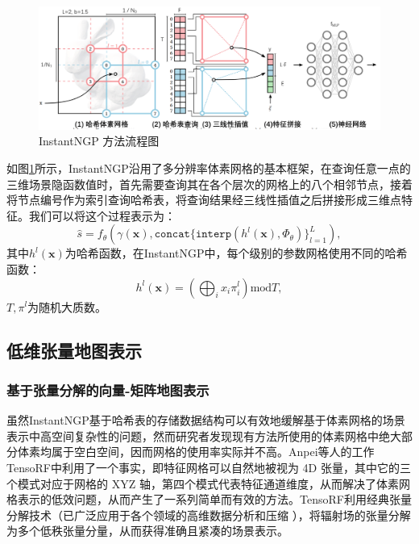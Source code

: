 \begin{figure}[ht]
    \centering
    \includegraphics[width=\textwidth]{undergraduate-thesis/images/related-work/instantngp.pdf}
    \caption{InstantNGP\cite{muller_instant_2022} 方法流程图}
    \label{fig:related-work instantngp}
\end{figure}

如图\ref{fig:related-work instantngp}所示，InstantNGP沿用了多分辨率体素网格的基本框架，在查询任意一点的三维场景隐函数值时，首先需要查询其在各个层次的网格上的八个相邻节点，接着将节点编号作为索引查询哈希表，将查询结果经三线性插值之后拼接形成三维点特征。我们可以将这个过程表示为：
\begin{equation}
    \hat{s} = f_\theta(\gamma(\mathbf{x}), \mathtt{concat}\{\mathtt{interp}(h^l(\mathbf{x}), \Phi_\theta)\}_{l=1}^L),
\end{equation}
其中$h^l(\mathbf{x})$为哈希函数，在InstantNGP中，每个级别的参数网格使用不同的哈希函数：
\begin{equation}
    h^l(\mathbf{x}) = \left(\bigoplus_{i}x_i\pi_i^l\right) \text{mod} T,
\end{equation}
$T, \pi^l$为随机大质数。

\subsection{低维张量地图表示}
\label{sec: related-work multi-plane-based implicit representations}
\subsubsection{基于张量分解的向量-矩阵地图表示}
虽然InstantNGP基于哈希表的存储数据结构可以有效地缓解基于体素网格的场景表示中高空间复杂性的问题，然而研究者发现现有方法所使用的体素网格中绝大部分体素均属于空白空间，因而网格的使用率实际并不高。Anpei等人\cite{chen_tensorf_2022}的工作TensoRF中利用了一个事实，即特征网格可以自然地被视为 4D 张量，其中它的三个模式对应于网格的 XYZ 轴，第四个模式代表特征通道维度，从而解决了体素网格表示的低效问题，从而产生了一系列简单而有效的方法。TensoRF利用经典张量分解技术（已广泛应用于各个领域的高维数据分析和压缩 \cite{kolda_tensor_2009}），将辐射场的张量分解为多个低秩张量分量，从而获得准确且紧凑的场景表示。


